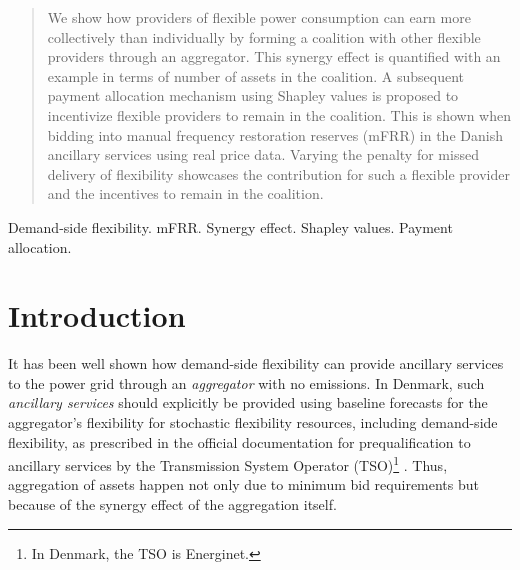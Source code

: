 \documentclass[lettersize,journal]{IEEEtran}
\begin{document}
\begin{abstract}
    We show how providers of flexible power consumption can earn more collectively than individually by forming a coalition with other flexible providers through an aggregator. This synergy effect is quantified with an example in terms of number of assets in the coalition. A subsequent payment allocation mechanism using Shapley values is proposed to incentivize flexible providers to remain in the coalition. This is shown when bidding into manual frequency restoration reserves (mFRR) in the Danish ancillary services using real price data. Varying the penalty for missed delivery of flexibility showcases the contribution for such a flexible provider and the incentives to remain in the coalition.
\end{abstract}

\begin{IEEEkeywords}
    Demand-side flexibility. mFRR. Synergy effect. Shapley values. Payment allocation.
\end{IEEEkeywords}

\tableofcontents

\section{Introduction}\label{sec:Introduction}

It has been well shown how demand-side flexibility can provide ancillary services to the power grid through an \textit{aggregator} with no emissions. In Denmark, such \textit{ancillary services} should explicitly be provided using baseline forecasts for the aggregator's flexibility for stochastic flexibility resources, including demand-side flexibility, as prescribed in the official documentation for prequalification to ancillary services by the Transmission System Operator (TSO)\footnote{In Denmark, the TSO is Energinet.} \cite{energinet:prequalification}. Thus, aggregation of assets happen not only due to minimum bid requirements \cite{energinet:Systemydelser} but because of the synergy effect of the aggregation itself.
\end{document}

